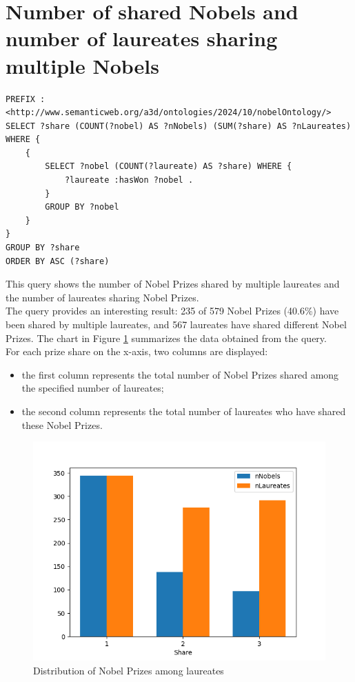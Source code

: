 \documentclass{article}
\begin{document}
\newpage

\section{Number of shared Nobels and number of laureates sharing multiple Nobels}

\begin{lstlisting}
PREFIX : <http://www.semanticweb.org/a3d/ontologies/2024/10/nobelOntology/>
SELECT ?share (COUNT(?nobel) AS ?nNobels) (SUM(?share) AS ?nLaureates) WHERE {
    {
        SELECT ?nobel (COUNT(?laureate) AS ?share) WHERE {
            ?laureate :hasWon ?nobel .
        }
        GROUP BY ?nobel
    }
}
GROUP BY ?share
ORDER BY ASC (?share)
\end{lstlisting}

\vspace{1em}

This query shows the number of Nobel Prizes shared by multiple laureates
and the number of laureates sharing Nobel Prizes.\\
The query provides an interesting result: 235 of 579 Nobel Prizes (40.6\%) have
been shared by multiple laureates, and 567 laureates have shared different Nobel Prizes.
The chart in Figure \ref{fig:prizeShare} summarizes the data obtained from the query.\\
For each prize share on the x-axis, two columns are displayed:
\begin{itemize}
	\item the first column represents the total number of Nobel Prizes shared among the specified number of laureates;
	\item the second column represents the total number of laureates who have shared these Nobel Prizes.
\end{itemize}

\begin{figure}[H]
	\centering
	\includegraphics[width=0.7\linewidth]{../queries/plots/nobelShare.png}
	\caption{Distribution of Nobel Prizes among laureates}
	\label{fig:prizeShare}
\end{figure}
\end{document}
